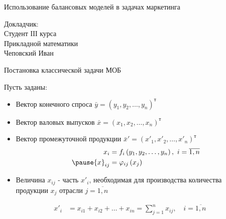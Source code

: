 \documentclass[serif,10pt,utf8, russian]{beamer}
\begin{document}
\begin{frame}
\begin{block}{\begin{center}Использование балансовых моделей в задачах маркетинга\end{center}}
\begin{center}
Докладчик:\\
Студент ІІІ курса\\
Прикладной математики\\
Чеповский Иван
\end{center}
\end{block}
\end{frame}

\begin{frame}{Постановка классической задачи МОБ}
\begin{center}
\par{Пусть заданы:}
\end{center}
\begin{itemize}
\item Вектор конечного спроса $\bar y = {\left({y}_1, {y}_2, \dots , {y}_n\right)}^\text{т}$
\pause
\item Вектор валовых выпусков $\bar x = {\left({x}_1, {x}_2, \dots , {x}_n\right)}^\text{т}$
\pause
\item Вектор промежуточной продукции $\bar x' = {\left({x'}_1, {x'}_2, \dots , {x'}_n\right)}^\text{т}$
\pause
\begin{align}
{x}_i &= {f}_i\left({y}_1, {y}_2, \dots, {y}_n\right),\ i=\overline{1,n}\label{one}\\
\pause
{x}_{ij} &= {\varphi}_{ij}\left({x}_j\right)\label{two}
\end{align}
\pause
\item Величина ${x}_{ij}$ - часть ${x'}_i$, необходимая для производства количества продукции ${x}_j$ отрасли $j = \overline{1,n}$
\end{itemize}
\pause
\begin{align}
{x'}_i &= {x}_{i1} + {x}_{i2} + \dots + {x}_{in} = \sum_{j=1}^n {x}_{ij}, \quad i = \overline{1,n} \label{three}
\end{align}
\end{frame}
\end{document}
